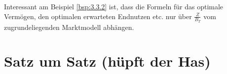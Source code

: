 \documentclass[a4paper,twoside,DIV15,BCOR12mm]{scrbook}
\begin{document}
\begin{bemerkung}
Interessant am Beispiel \ref{bsp:3.3.2} ist, dass die Formeln für das optimale Vermögen, den optimalen erwarteten Endnutzen etc. nur über $\frac{Z}{B_T}$ vom zugrundeliegenden Marktmodell abhängen.
\end{bemerkung}

\setcounter{secnumdepth}{-1}
\chapter{Satz um Satz (hüpft der Has)}

\renewcommand{\indexname}{Stichwortverzeichnis}
\printindex
\end{document}
